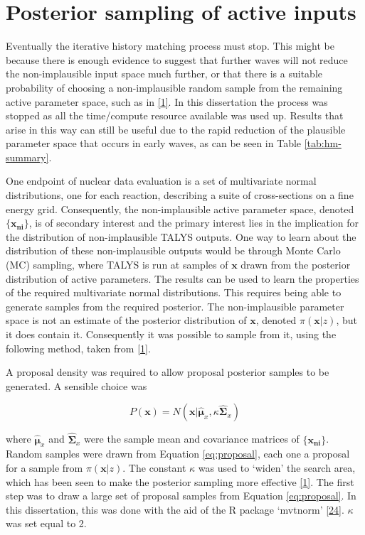 \documentclass[
  12pt,
  a4paper,
  twoside]{book}
\begin{document}
\hypertarget{posterior-sampling}{%
\section{Posterior sampling of active inputs}\label{posterior-sampling}}

Eventually the iterative history matching process must stop. This might be because there is enough evidence to suggest that further waves will not reduce the non-implausible input space much further, or that there is a suitable probability of choosing a non-implausible random sample from the remaining active parameter space, such as in \protect\hyperlink{ref-jeremy_histmatch}{{[}1{]}}. In this dissertation the process was stopped as all the time/compute resource available was used up. Results that arise in this way can still be useful due to the rapid reduction of the plausible parameter space that occurs in early waves, as can be seen in Table \ref{tab:hm-summary}.

One endpoint of nuclear data evaluation is a set of multivariate normal distributions, one for each reaction, describing a suite of cross-sections on a fine energy grid. Consequently, the non-implausible active parameter space, denoted \(\{\mathbf{x_{ni}}\}\), is of secondary interest and the primary interest lies in the implication for the distribution of non-implausible TALYS outputs. One way to learn about the distribution of these non-implausible outputs would be through Monte Carlo (MC) sampling, where TALYS is run at samples of \(\mathbf{x}\) drawn from the posterior distribution of active parameters. The results can be used to learn the properties of the required multivariate normal distributions. This requires being able to generate samples from the required posterior. The non-implausible parameter space is not an estimate of the posterior distribution of \(\mathbf{x}\), denoted \(\pi(\mathbf{x}|z)\), but it does contain it. Consequently it was possible to sample from it, using the following method, taken from \protect\hyperlink{ref-jeremy_histmatch}{{[}1{]}}.

A proposal density was required to allow proposal posterior samples to be generated. A sensible choice was

\begin{equation}
\label{eq:proposal}
P(\mathbf{x}) = N\left(\mathbf{x}|\hat{\mathbf{\mu}}_x, \kappa\hat{\mathbf{\Sigma}}_x \right)
\end{equation}

where \(\hat{\mathbf{\mu}}_x\) and \(\hat{\mathbf{\Sigma}}_x\) were the sample mean and covariance matrices of \(\{\mathbf{x_{ni}}\}\). Random samples were drawn from Equation \eqref{eq:proposal}, each one a proposal for a sample from \(\pi(\mathbf{x}|z)\). The constant \(\kappa\) was used to `widen' the search area, which has been seen to make the posterior sampling more effective \protect\hyperlink{ref-jeremy_histmatch}{{[}1{]}}. The first step was to draw a large set of proposal samples from Equation \eqref{eq:proposal}. In this dissertation, this was done with the aid of the R package `mvtnorm' \protect\hyperlink{ref-mvtnorm}{{[}24{]}}. \(\kappa\) was set equal to 2.
\end{document}
